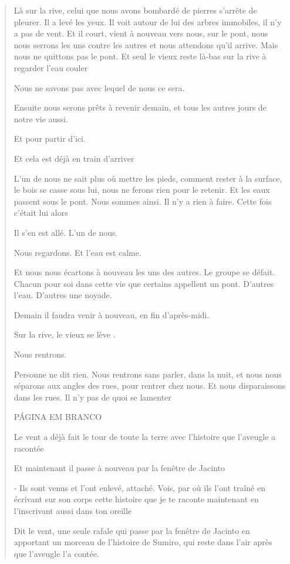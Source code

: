 \begin{quote}
Là sur la rive, celui que nous avons bombardé de pierres s'arrête de
pleurer. Il a levé les yeux. Il voit autour de lui des arbres immobiles,
il n'y a pas de vent. Et il court, vient à nouveau vers nous, sur le
pont, nous nous serrons les uns contre les autres et nous attendons
qu'il arrive. Mais nous ne quittons pas le pont. Et seul le vieux reste
là-bas sur la rive à regarder l'eau couler

Nous ne savons pas avec lequel de nous ce sera.

Ensuite nous serons prêts à revenir demain, et tous les autres jours de
notre vie aussi.

Et pour partir d'ici.

Et cela est déjà en train d'arriver

L'un de nous ne sait plus où mettre les pieds, comment rester à la
surface, le bois se casse sous lui, nous ne ferons rien pour le retenir.
Et les eaux passent sous le pont. Nous sommes ainsi. Il n'y a rien à
faire. Cette fois c'était lui alors

Il s'en est allé. L'un de nous.

Nous regardons. Et l'eau est calme.

Et nous nous écartons à nouveau les uns des autres. Le groupe se défait.
Chacun pour soi dans cette vie que certains appellent un pont. D'autres
l'eau. D'autres une noyade.

Demain il faudra venir à nouveau, en fin d'après-midi.

Sur la rive, le vieux se lève .

Nous rentrons.

Personne ne dit rien. Nous rentrons sans parler, dans la nuit, et nous
nous séparons aux angles des rues, pour rentrer chez nous. Et nous
disparaissons dans les rues. Il n'y pas de quoi se lamenter

PÁGINA EM BRANCO

Le vent a déjà fait le tour de toute la terre avec l'histoire que
l'aveugle a racontée

Et maintenant il passe à nouveau par la fenêtre de Jacinto

- Ils sont venus et l'ont enlevé, attaché. Vois, par où ils l'ont traîné
en écrivant sur son corps cette histoire que je te raconte maintenant en
l'inscrivant aussi dans ton oreille

Dit le vent, une seule rafale qui passe par la fenêtre de Jacinto en
apportant un morceau de l'histoire de Sumiro, qui reste dans l'air après
que l'aveugle l'a contée.


\end{quote}
